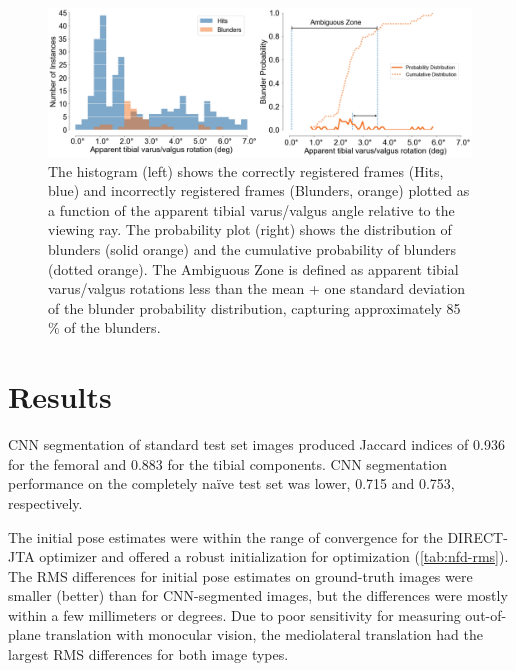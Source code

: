 {\begin{figure}[hb]
	\centering
	\includegraphics[width = \linewidth]{figs/jtml-paper/fig5-histo.png}
	\caption[The histogram shows the correctly registered frames and incorrectly
		registered frames plotted as a function of the apparent tibial varus/valgus
		angle relative to the viewing ray]{The histogram (left) shows the correctly
		registered frames (Hits, blue) and incorrectly registered frames
		(Blunders, orange) plotted as a function of the apparent tibial
		varus/valgus angle relative to the viewing ray. The probability plot
		(right) shows the distribution of blunders (solid orange) and the
		cumulative probability of blunders (dotted orange). The Ambiguous Zone is
		defined as apparent tibial varus/valgus rotations less than the mean + one
		standard deviation of the blunder probability distribution, capturing
		approximately 85 \% of the blunders.}
	\label{fig:histo-pdf}
\end{figure}


\section{Results}
\label{sec:jtml-results}
CNN segmentation of standard test set images produced Jaccard indices of 0.936
for the femoral and 0.883 for the tibial components. CNN segmentation
performance on the completely naïve test set was lower, 0.715 and 0.753,
respectively.

The initial pose estimates were within the range of convergence for the
DIRECT-JTA optimizer and offered a robust initialization for optimization
(\cref{tab:nfd-rms}). The RMS differences for initial pose estimates on
ground-truth images were smaller (better) than for CNN-segmented images, but the
differences were mostly within a few millimeters or degrees. Due to poor
sensitivity for measuring out-of-plane translation with monocular vision, the
mediolateral translation had the largest RMS differences for both image types.


}
